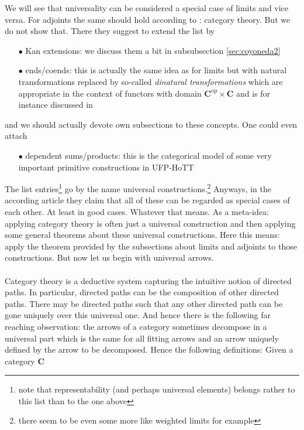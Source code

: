 We will see that universality can be considered a special case of limits and vice versa. For adjoints the same should hold according to \cite{wiki-nlab0000}: category theory. But we do not show that. There they suggest to extend the list by
\begin{enumerate}
\item[$\bullet$]
Kan extensions: we discuss them a bit in subsubsection \ref{sec:coyoneda2}
\item[$\bullet$]
ends/coends: this is actually the same idea as for limits but with natural transformations replaced by so-called \textit{dinatural transformations} which are appropriate in the context of functors with domain $\mathbf{C}^{\mathrm{op}} \times \mathbf{C}$ and is for instance discussed in \cite{0b0672dc}
\end{enumerate}
and we should actually devote own subsections to these concepts. One could even attach
\begin{enumerate}
\item[$\bullet$]
dependent sums/products: this is the categorical model of some very important primitive constructions in UFP-HoTT
\end{enumerate}
The list entries\footnote{note that representability (and perhaps universal elements) belongs rather to this list than to the one above} go by the name {\glqq}universal constructions{\grqq}.\footnote{there seem to be even some more like weighted limits for example} Anyways, in the according \cite{wiki-nlab0000} article they claim that all of these can be regarded as special cases of each other. At least in {\glqq}good{\grqq} cases. Whatever that means. As a meta-idea: applying category theory is often just a universal construction and then applying some general theorems about these universal constructions. Here this means: apply the theorem provided by the subsections about limits and adjoints to those constructions. But now let us begin with universal arrows.
\\\\
Category theory is a deductive system capturing the intuitive notion of directed paths. In particular, directed paths can be the composition of other directed paths. There may be directed paths such that any other directed path can be gone uniquely over this {\glqq}universal{\grqq} one. And hence there is the following far reaching observation: the arrows of a category sometimes decompose in a {\glqq}universal{\grqq} part which is the same for all {\glqq}fitting{\grqq} arrows and an arrow uniquely defined by the arrow to be decomposed. Hence the following definitions: Given a category $\mathbf{C}$
